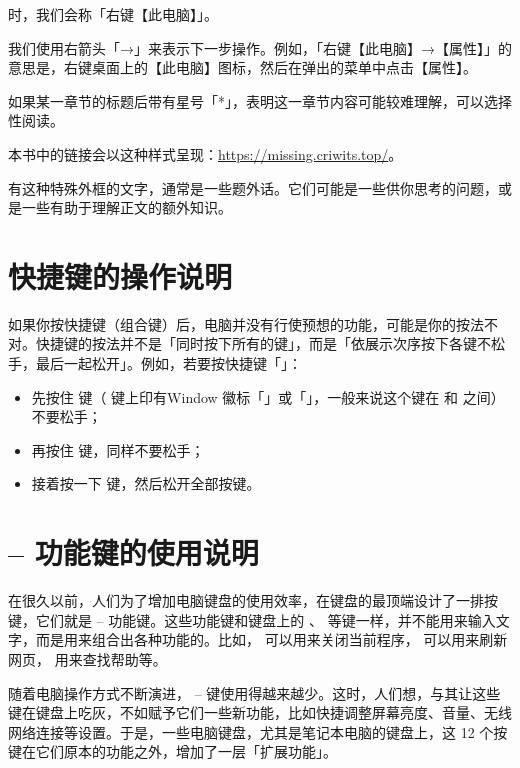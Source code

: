 \noindent 时，我们会称「右键【此电脑】」。

我们使用右箭头「→」来表示下一步操作。例如，「右键【此电脑】→【属性】」的意思是，右键桌面上的【此电脑】图标，然后在弹出的菜单中点击【属性】。

如果某一章节的标题后带有星号「*」，表明这一章节内容可能较难理解，可以选择性阅读。

本书中的链接会以这种样式呈现：\url{https://missing.criwits.top/}。

\begin{note}
  有这种特殊外框的文字，通常是一些题外话。它们可能是一些供你思考的问题，或是一些有助于理解正文的额外知识。
\end{note}

\section{快捷键的操作说明}

如果你按快捷键（组合键）后，电脑并没有行使预想的功能，可能是你的按法不对。快捷键的按法并不是「同时按下所有的键」，而是「依展示次序按下各键不松手，最后一起松开」。例如，若要按快捷键「」：

\begin{itemize}
  \item 先按住 \keys{\Windows} 键（\keys{\Windows} 键上印有Window 徽标「\Windows」或「\WindowsTen」，一般来说这个键在  和  之间）不要松手；
  \item 再按住  键，同样不要松手；
  \item 接着按一下  键，然后松开全部按键。
\end{itemize}

\section{ --  功能键的使用说明}

在很久以前，人们为了增加电脑键盘的使用效率，在键盘的最顶端设计了一排按键，它们就是  --  功能键。这些功能键和键盘上的 、 等键一样，并不能用来输入文字，而是用来组合出各种功能的。比如， 可以用来关闭当前程序， 可以用来刷新网页， 用来查找帮助等。

随着电脑操作方式不断演进， --  键使用得越来越少。这时，人们想，与其让这些键在键盘上吃灰，不如赋予它们一些新功能，比如快捷调整屏幕亮度、音量、无线网络连接等设置。于是，一些电脑键盘，尤其是笔记本电脑的键盘上，这 12 个按键在它们原本的功能之外，增加了一层「扩展功能」。

